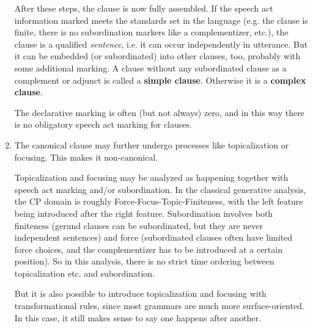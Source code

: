 \documentclass{article}
\newcommand*{\concept}[1]{\textbf{#1}}
\begin{document}
\begin{enumerate}
    After these steps, the clause is now fully assembled. 
    If the speech act information marked meets the standards set in the language
    (e.g. the clause is finite, there is no subordination markers like a complementizer, etc.), 
    the clause is a qualified \emph{sentence}, 
    i.e. it can occur independently in utterance.
    But it can be embedded (or subordinated) into other clauses, too, probably with some additional marking.
    A clause without any subordinated clause as a complement or adjunct is called a \concept{simple clause}.
    Otherwise it is a \concept{complex clause}.

    The declarative marking is often (but not always) zero, 
    and in this way there is no obligatory speech act marking for clauses. 

    \item The canonical clause may further undergo processes like topicalization or focusing.
    This makes it non-canonical.

    Topicalization and focusing may be analyzed as happening together 
    with speech act marking and/or subordination.
    In the classical generative analysis, the CP domain is roughly Force-Focus-Topic-Finiteness,
    with the left feature being introduced after the right feature.
    Subordination involves both 
    finiteness (gerund clauses can be subordinated, but they are never independent sentences) 
    and force (subordinated clauses often have limited force choices, 
    and the complementizer has to be introduced at a certain position).
    So in this analysis, there is no strict time ordering between topicalization etc. and subordination.

    But it is also possible to introduce topicalization and focusing with transformational rules,
    since most grammars are much more surface-oriented.
    In this case, it still makes sense to say one happens after another.


\end{enumerate}
\end{document}
